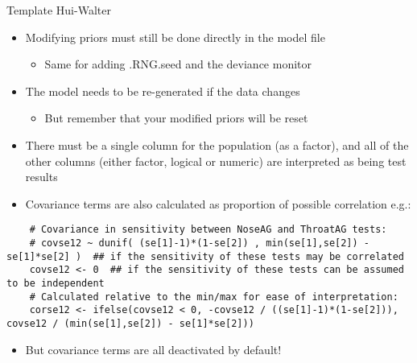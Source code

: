 \documentclass[
  ignorenonframetext,
  aspectratio=169,
]{beamer}
\providecommand{\tightlist}{%
  \setlength{\itemsep}{0pt}\setlength{\parskip}{0pt}}
\begin{document}
\begin{frame}{Template Hui-Walter}
\protect\hypertarget{template-hui-walter-1}{}
\begin{itemize}
\tightlist
\item
  Modifying priors must still be done directly in the model file

  \begin{itemize}
  \tightlist
  \item
    Same for adding .RNG.seed and the deviance monitor
  \end{itemize}
\item
  The model needs to be re-generated if the data changes

  \begin{itemize}
  \tightlist
  \item
    But remember that your modified priors will be reset
  \end{itemize}
\item
  There must be a single column for the population (as a factor), and
  all of the other columns (either factor, logical or numeric) are
  interpreted as being test results
\end{itemize}
\end{frame}

\begin{frame}[fragile]
\begin{itemize}
\tightlist
\item
  Covariance terms are also calculated as proportion of possible
  correlation e.g.:
\end{itemize}

\scriptsize

\begin{verbatim}
    # Covariance in sensitivity between NoseAG and ThroatAG tests:
    # covse12 ~ dunif( (se[1]-1)*(1-se[2]) , min(se[1],se[2]) - se[1]*se[2] )  ## if the sensitivity of these tests may be correlated
    covse12 <- 0  ## if the sensitivity of these tests can be assumed to be independent
    # Calculated relative to the min/max for ease of interpretation:
    corse12 <- ifelse(covse12 < 0, -covse12 / ((se[1]-1)*(1-se[2])), covse12 / (min(se[1],se[2]) - se[1]*se[2]))
\end{verbatim}

\normalsize

\pause

\begin{itemize}
\tightlist
\item
  But covariance terms are all deactivated by default!
\end{itemize}
\end{frame}
\end{document}
